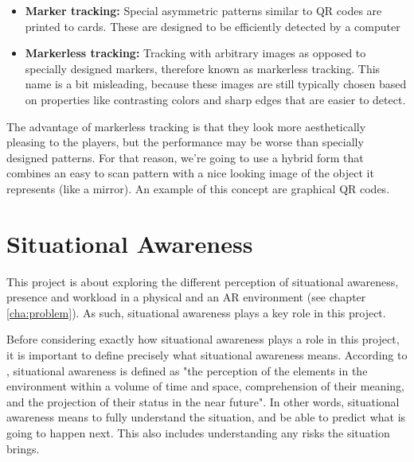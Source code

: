 			\begin{itemize}
				\item \textbf{Marker tracking:} Special asymmetric patterns
					similar to QR codes are printed to cards. These are designed
					to be efficiently detected by a computer

				\item \textbf{Markerless tracking:} Tracking with arbitrary
					images as opposed to specially designed markers, therefore
					known as markerless tracking. This name is a bit misleading,
					because these images are still typically chosen based on
					properties like contrasting colors and sharp edges that are
					easier to detect.
			\end{itemize}

			The advantage of markerless tracking is that they look more
			aesthetically pleasing to the players, but the performance may be
			worse than specially designed patterns. For that reason, we're going
			to use a hybrid form that combines an easy to scan pattern with a
			nice looking image of the object it represents (like a mirror). An
			example of this concept are graphical QR codes. \cite{gqr}

	\section{Situational Awareness} \label{sec:awareness}
		This project is about exploring the different perception of situational
		awareness, presence and workload in a physical and an AR environment
		(see chapter \ref{cha:problem}). As such, situational awareness plays a
		key role in this project.

		Before considering exactly how situational awareness plays a role in this
		project, it is important to define precisely what situational awareness
		means. According to \cite{endsley}, situational awareness is defined as
		"the perception of the elements in the environment within a volume of
		time and space, comprehension of their meaning, and the projection of
		their status in the near future". In other words, situational awareness
		means to fully understand the situation, and be able to predict what is
		going to happen next. This also includes understanding any risks the
		situation brings.

